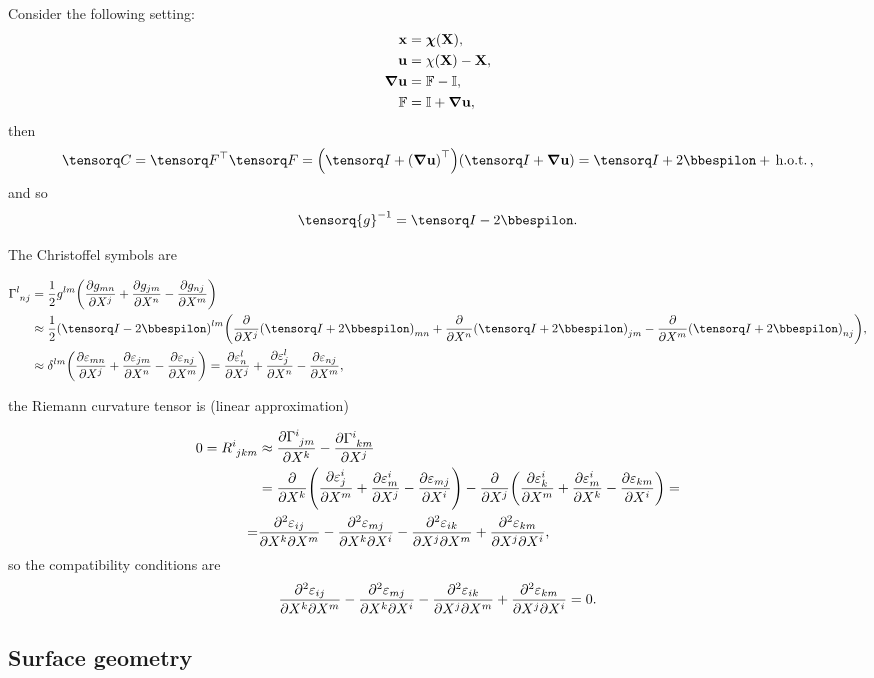 \documentclass[../main.tex]{subfiles}
\begin{document}
Consider the following setting:
\begin{align*}
	\vb{x}&=\vb*{\chi}\qty(\vb{X}),\\
	\vb{u}&= \vb{\chi}\qty(\vb{X})-\vb{X},\\
	\grad \vb{u} &= \mathbb{F} - \mathbb{I}, \\
	\mathbb{F} &= \mathbb{I} + \grad \vb{u},\\
\end{align*}
then
\[
	\rcg = \transpose{\fgrad}\fgrad=\qty(\identity+\transpose{\qty(\grad \vb{u})})\qty(\identity+\grad \vb{u}) = \identity + 2 \bbespilon + \, \text{h.o.t.} \,,
\]
and so
\[
	\inverse{\tensorq{g}} = \identity - 2 \bbespilon.
\]

The Christoffel symbols are

\begin{align*}
	\Gamma \indices{^l_{nj}}&= \frac{1}{2}g^{lm}\qty(\pdv{g_{mn}}{X^j}+\pdv{g_{jm}}{X^n}-\pdv{g_{nj}}{X^m}) \\
				&\approx \frac{1}{2}\qty(\identity-2 \bbespilon)^{lm}\qty(\pdv{X^j}\qty(\identity+2 \bbespilon)_{mn}+\pdv{X^n}\qty(\identity+2 \bbespilon)_{jm}-\pdv{X^m}\qty(\identity+2 \bbespilon)_{nj}), \\
				&\approx \delta^{lm}\qty(\pdv{\varepsilon_{mn}}{X^j}+\pdv{\varepsilon_{jm}}{X^n}-\pdv{\varepsilon_{nj}}{X^m}) = \pdv{\varepsilon_{n}^l}{X^j}+\pdv{\varepsilon_{j}^l}{X^n}-\pdv{\varepsilon_{nj}}{X^m},
\end{align*}

the Riemann curvature tensor is (linear approximation)

\begin{align*}
0 = R \indices{^i_{jkm}}& \approx \pdv{\Gamma \indices{^i_{jm}}}{X^k}-\pdv{\Gamma \indices{^i_{km}}}{X^j}\\
			& = \pdv{X^k}\qty(\pdv{\varepsilon^i_j}{X^m}+\pdv{\varepsilon^i_m}{X^j}-\pdv{\varepsilon_{mj}}{X^i})-\pdv{X^j}\qty(\pdv{\varepsilon^i_k}{X^m}+\pdv{\varepsilon^i_m}{X^k}-\pdv{\varepsilon_{km}}{X^i}) =\\
			 =& \pdv[2]{\varepsilon_{ij}}{X^k}{X^m}-\pdv[2]{\varepsilon_{mj}}{X^k}{X^i}-\pdv[2]{\varepsilon_{ik}}{X^j}{X^m}+\pdv[2]{\varepsilon_{km}}{X^j}{X^i},
\end{align*}
so the compatibility conditions are
\[
	\pdv[2]{\varepsilon_{ij}}{X^k}{X^m}-\pdv[2]{\varepsilon_{mj}}{X^k}{X^i}-\pdv[2]{\varepsilon_{ik}}{X^j}{X^m}+\pdv[2]{\varepsilon_{km}}{X^j}{X^i} = 0.
\]

\subsection{Surface geometry}
\label{sec:surface_geometry}
\end{document}
